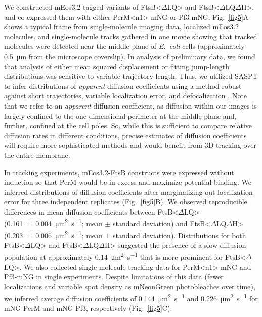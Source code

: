 \documentclass[pdflatex,sn-nature]{sn-jnl}%
\def\textsuperscript#1{<#1>}%
\newcommand\ec{\textit{E.~coli}}
\newcommand\ftsbdLQ{FtsB\textsuperscript{$\Delta{}$LQ}}
\newcommand\ftsbdLQdH{FtsB\textsuperscript{$\Delta{}$LQ$\Delta{}$H}}
\newcommand\permN{PerM\textsuperscript{n1}}
\begin{document}
We constructed mEos3.2-tagged variants of \ftsbdLQ{} and \ftsbdLQdH{}, and co-expressed them with either \permN{}-mNG or Pf3-mNG.
Fig.~\ref{fig5}A shows a typical frame from single-molecule imaging data, localized mEos3.2 molecules, and single-molecule tracks gathered in one movie showing that tracked molecules were detected near the middle plane of \ec{} cells (approximately \qty{0.5}{\um} from the microscope coverslip).
In analysis of preliminary data, we found that analysis of either mean squared displacement or fitting jump-length distributions was sensitive to variable trajectory length.
Thus, we utilized SASPT \citep{heckertRecoveringMixturesFastdiffusing2022a} to infer distributions of \textit{apparent} diffusion coefficients using a method robust against short trajectories, variable localization error, and defocalization \cite{hansenRobustModelbasedAnalysis2018a}.
Note that we refer to an \textit{apparent} diffusion coefficient, as diffusion within our images is largely confined to the one-dimensional perimeter at the middle plane and, further, confined at the cell poles.
So, while this is sufficient to compare relative diffusion rates in different conditions, precise estimates of diffusion coefficients will require more sophisticated methods and would benefit from 3D tracking over the entire membrane.

In tracking experiments, mEos3.2-FtsB constructs were expressed without induction so that PerM would be in excess and maximize potential binding.
We inferred distributions of diffusion coefficients after marginalizing out localization error for three independent replicates (Fig.~\ref{fig5}B).
We observed reproducible differences in mean diffusion coefficients between \ftsbdLQ{} (\qty{0.161 +- 0.004}{\square\um\per\s}; mean $\pm$ standard deviation) and \ftsbdLQdH{} (\qty{0.203 +- 0.006}{\square\um\per\s}; mean $\pm$ standard deviation).
Distributions for both \ftsbdLQ{} and \ftsbdLQdH{} suggested the presence of a slow-diffusion population at approximately \qty{0.14}{\square\um\per\s} that is more prominent for \ftsbdLQ{}.
We also collected single-molecule tracking data for \permN{}-mNG and Pf3-mNG in single experiments.
Despite limitations of this data (fewer localizations and variable spot density as mNeonGreen photobleaches over time), we inferred average diffusion coefficients of \qty{0.144}{\square\um\per\s} and \qty{0.226}{\square\um\per\s} for mNG-PerM and mNG-Pf3, respectively (Fig.~\ref{fig5}C).
\end{document}
